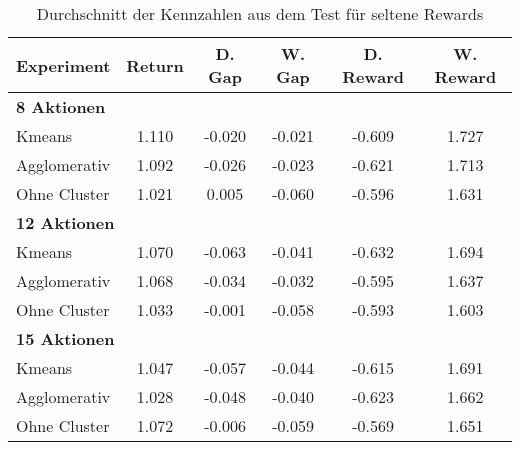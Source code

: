 \begin{table}[ht]
\centering
\begin{tabular}{lccccc}
\hline
\textbf{Experiment} & \textbf{Return} & \textbf{D. Gap} & \textbf{W. Gap} & \textbf{D. Reward} & \textbf{W. Reward} \\
\hline
\multicolumn{6}{l}{\textbf{8 Aktionen}} \\
\hspace{1em}Kmeans & 1.110 & -0.020 & -0.021 & -0.609 & 1.727 \\
\hspace{1em}Agglomerativ & 1.092 & -0.026 & -0.023 & -0.621 & 1.713 \\
\hspace{1em}Ohne Cluster & 1.021 & 0.005 & -0.060 & -0.596 & 1.631 \\
\hline
\multicolumn{6}{l}{\textbf{12 Aktionen}} \\
\hspace{1em}Kmeans & 1.070 & -0.063 & -0.041 & -0.632 & 1.694 \\
\hspace{1em}Agglomerativ & 1.068 & -0.034 & -0.032 & -0.595 & 1.637 \\
\hspace{1em}Ohne Cluster & 1.033 & -0.001 & -0.058 & -0.593 & 1.603 \\
\hline
\multicolumn{6}{l}{\textbf{15 Aktionen}} \\
\hspace{1em}Kmeans & 1.047 & -0.057 & -0.044 & -0.615 & 1.691 \\
\hspace{1em}Agglomerativ & 1.028 & -0.048 & -0.040 & -0.623 & 1.662 \\
\hspace{1em}Ohne Cluster & 1.072 & -0.006 & -0.059 & -0.569 & 1.651 \\
\hline
\end{tabular}
\caption{Durchschnitt der Kennzahlen aus dem Test für seltene Rewards}
\end{table}
